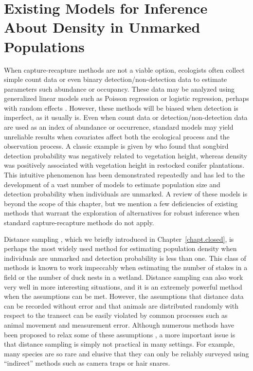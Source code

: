 \section{Existing Models for Inference About Density in Unmarked Populations}
\label{Sect.existing-unmarked}
When capture-recapture methods are not a viable option, ecologists
often collect simple count data or even binary detection/non-detection data
to estimate parameters such abundance or occupancy.
These
data may be analyzed using generalized linear models such as
Poisson regression or logistic regression, perhaps with random
effects \citep{zuur_etal:2009}. %
However, these methods will be biased when detection is imperfect, as
it usually is. Even when count data or detection/non-detection data are
used as an index of abundance or occurrence, standard models may yield
unreliable results when covariates affect both the ecological process
and the observation process. A classic example is given by
\citet{bibby_buckland:1987} who found that songbird detection
probability was negatively related to vegetation height, whereas
density was positively associated with vegetation height in restocked
conifer plantations. This intuitive phenomenon has been
demonstrated repeatedly \citep[e.g.][]{kery:2008,sillett_etal:2012} and has led to the
development of a vast number of models to estimate population size and
detection probability when individuals are unmarked. A review of these
models is beyond the scope of this
chapter, but we mention a few deficiencies of existing methods
that warrant the exploration of alternatives for robust inference when
standard capture-recapture methods do not apply.

Distance sampling \citep{buckland_etal:2001}, which we briefly
introduced in Chapter~\ref{chapt.closed},
is perhaps the most widely used method for
estimating population density when individuals are unmarked and
detection probability is less than one. This class of methods is known
to work impeccably when estimating the number of stakes in a field or
the number of duck nests in a wetland. Distance sampling can also work very well in
more interesting situations, and it is an extremely powerful method when
the assumptions can be met. However, the assumptions that distance
data can be recorded without error and that animals are distributed
randomly with respect to the transect can be easily violated by
common processes such as animal movement and measurement
error. Although numerous methods have been proposed to
relax some of these assumptions
\citet{royle_etal:2004, borchers_etal:1998, johnson_etal:2010,
  chandler_etal:2011},
a more important issue is that distance
sampling is simply not practical in many settings. For example, many
species are so rare and elusive that they can only be reliably
surveyed using ``indirect'' methods such as camera traps or hair snares. %

